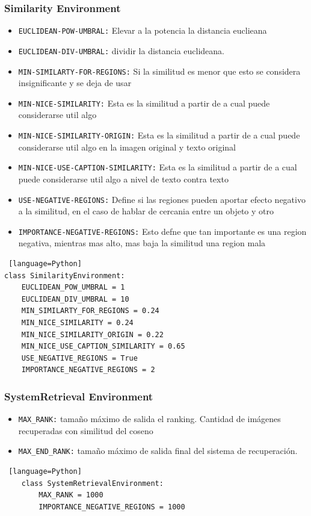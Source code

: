 \subsubsection*{Similarity Environment}

\begin{itemize}
\item \verb|EUCLIDEAN-POW-UMBRAL:| Elevar a la potencia la distancia euclieana
\item \verb|EUCLIDEAN-DIV-UMBRAL:| dividir la distancia euclideana.
\item \verb|MIN-SIMILARTY-FOR-REGIONS:| Si la similitud es menor que esto se considera insignificante y se deja de usar
\item \verb|MIN-NICE-SIMILARITY:| Esta es la similitud a partir de a cual puede considerarse util algo
\item \verb|MIN-NICE-SIMILARITY-ORIGIN:| Esta es la similitud a partir de a cual puede considerarse util algo en la imagen original y texto original
\item \verb|MIN-NICE-USE-CAPTION-SIMILARITY:| Esta es la similitud a partir de a cual puede considerarse util algo a nivel de texto contra texto
\item \verb|USE-NEGATIVE-REGIONS:| Define si las regiones pueden aportar efecto negativo a la similitud, en el caso de hablar de cercania entre un objeto y otro
\item \verb|IMPORTANCE-NEGATIVE-REGIONS:| Esto defne que tan importante es una region negativa, mientras mas alto, mas baja la similitud una region mala
\end{itemize}
    
\begin{lstlisting} [language=Python]
class SimilarityEnvironment:
    EUCLIDEAN_POW_UMBRAL = 1
    EUCLIDEAN_DIV_UMBRAL = 10
    MIN_SIMILARTY_FOR_REGIONS = 0.24
    MIN_NICE_SIMILARITY = 0.24
    MIN_NICE_SIMILARITY_ORIGIN = 0.22
    MIN_NICE_USE_CAPTION_SIMILARITY = 0.65
    USE_NEGATIVE_REGIONS = True
    IMPORTANCE_NEGATIVE_REGIONS = 2
\end{lstlisting} 

\subsubsection*{SystemRetrieval Environment}
    \begin{itemize}
    \item \verb|MAX_RANK:| tamaño m\'aximo de salida el ranking. Cantidad de im\'agenes recuperadas con similitud del coseno
    \item \verb|MAX_END_RANK:| tamaño m\'aximo de salida final del sistema de recuperaci\'on.
    \end{itemize}
        
    \begin{lstlisting} [language=Python]
    class SystemRetrievalEnvironment:
        MAX_RANK = 1000
        IMPORTANCE_NEGATIVE_REGIONS = 1000
    \end{lstlisting} 
